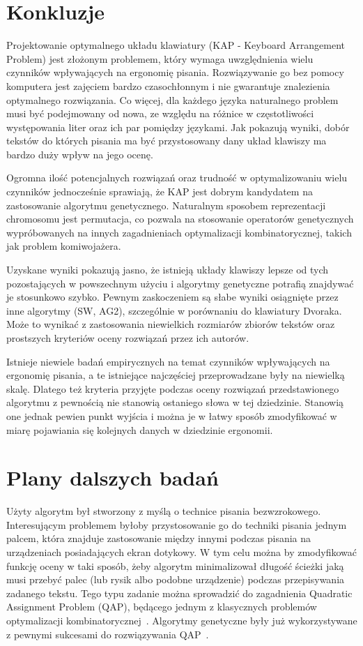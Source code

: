 \documentclass[brudnopis]{xmgr}
\begin{document}
\summary

\section{Konkluzje}

Projektowanie optymalnego układu klawiatury (KAP - Keyboard Arrangement Problem) jest złożonym problemem, który wymaga uwzględnienia wielu czynników wpływających na ergonomię pisania. Rozwiązywanie go bez pomocy komputera jest zajęciem bardzo czasochłonnym i nie gwarantuje znalezienia optymalnego rozwiązania. Co więcej, dla każdego języka naturalnego problem musi być podejmowany od nowa, ze względu na różnice w częstotliwości występowania liter oraz ich par pomiędzy językami. Jak pokazują wyniki, dobór tekstów do których pisania ma być przystosowany dany układ klawiszy ma bardzo duży wpływ na jego ocenę.

Ogromna ilość potencjalnych rozwiązań oraz trudność w optymalizowaniu wielu czynników jednocześnie sprawiają, że KAP jest dobrym kandydatem na zastosowanie algorytmu genetycznego. Naturalnym sposobem reprezentacji chromosomu jest permutacja, co pozwala na stosowanie operatorów genetycznych wypróbowanych na innych zagadnieniach optymalizacji kombinatorycznej, takich jak problem komiwojażera.

Uzyskane wyniki pokazują jasno, że istnieją układy klawiszy lepsze od tych pozostających w powszechnym użyciu i algorytmy genetyczne potrafią znajdywać je stosunkowo szybko. Pewnym zaskoczeniem są słabe wyniki osiągnięte przez inne algorytmy (SW, AG2), szczególnie w porównaniu do klawiatury Dvoraka. Może to wynikać z zastosowania niewielkich rozmiarów zbiorów tekstów oraz prostszych kryteriów oceny rozwiązań przez ich autorów.

Istnieje niewiele badań empirycznych na temat czynników wpływających na ergonomię pisania, a te istniejące najczęściej przeprowadzane były na niewielką skalę. Dlatego też kryteria przyjęte podczas oceny rozwiązań przedstawionego algorytmu z pewnością nie stanowią ostaniego słowa w tej dziedzinie. Stanowią one jednak pewien punkt wyjścia i można je w łatwy sposób zmodyfikować w miarę pojawiania się kolejnych danych w dziedzinie ergonomii.

\section{Plany dalszych badań}

Użyty algorytm był stworzony z myślą o technice pisania bezwzrokowego. Interesującym problemem byłoby przystosowanie go do techniki pisania jednym palcem, która znajduje zastosowanie między innymi podczas pisania na urządzeniach posiadających ekran dotykowy. W tym celu można by zmodyfikować funkcję oceny w taki sposób, żeby algorytm minimalizował długość ścieżki jaką musi przebyć palec (lub rysik albo podobne urządzenie) podczas przepisywania zadanego tekstu. Tego typu zadanie można sprowadzić do zagadnienia Quadratic Assignment Problem (QAP), będącego jednym z klasycznych problemów optymalizacji kombinatorycznej~\cite{Ji_asolution}. Algorytmy genetyczne były już wykorzystywane z pewnymi sukcesami do rozwiązywania QAP~\cite{Misevicius200465}.
\end{document}
